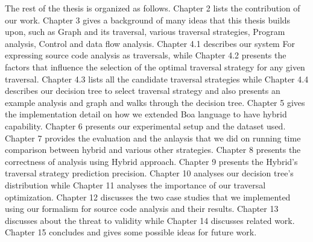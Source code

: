 The rest of the thesis is organized as follows. Chapter 2 lists the contribution of our work. Chapter 3 gives a background of many ideas that this thesis builds upon, such as Graph and its traversal, various traversal strategies, Program analysis, Control and data flow analysis. Chapter 4.1 describes our system For expressing source code analysis as traversals, while Chapter 4.2 presents the factors that influence the selection of the optimal traversal strategy for any given traversal. Chapter 4.3 lists all the candidate traversal strategies while Chapter 4.4 describes our decision tree to select traversal strategy and also presents an example analysis and graph and walks through the decision tree. Chapter 5 gives the implementation detail on how we extended Boa language to have hybrid capability. Chapter 6 presents our experimental setup and the dataset used. Chapter 7 provides the evaluation and the anlaysis that we did on running time comparison between hybrid and various other strategies. Chapter 8 presents the correctness of analysis using Hybrid approach. Chapter 9 presents the Hybrid's traversal strategy prediction precision. Chapter 10 analyses our decision tree's distribution while Chapter 11 analyses the importance of our traversal optimization. Chapter 12 discusses the two case studies that we implemented using our formalism for source code analysis and their results. Chapter 13 discusses about the threat to validity while Chapter 14 discusses related work. Chapter 15 concludes and gives some possible ideas for future work.